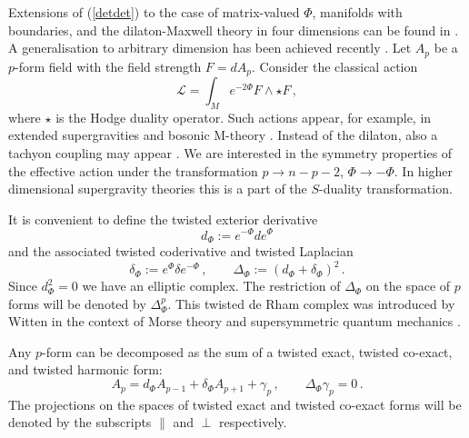 Extensions of (\ref{detdet}) to the case of matrix-valued $\Phi$,
manifolds with boundaries, and the dilaton-Maxwell theory in
four dimensions can be found in \cite{Vassilevich:2000kt}.
A generalisation to arbitrary dimension has been achieved recently 
\cite{Gilkey:2002qd}. Let $A_p$ be a $p$-form field with the field
strength $F=dA_p$. Consider the classical action
\begin{equation}
{\mathcal{L}}=\int_M e^{-2\Phi} F\wedge \star F \,,\label{pformact}
\end{equation}
where $\star$ is the Hodge duality operator. 
Such actions appear, for example, in extended supergravities
\cite{Cremmer:1978tt} and bosonic M-theory \cite{Horowitz:2000gn}.
Instead of the dilaton, also a tachyon coupling may appear
\cite{Klebanov:1998yy}. We are interested in the symmetry properties
of the effective action under the transformation 
$p\to n-p-2$, $\Phi\to -\Phi$. In higher dimensional supergravity
theories this is a part of the $S$-duality transformation.

It is convenient to define
the twisted exterior derivative
\begin{equation}
d_\Phi :=e^{-\Phi} d e^{\Phi} \label{twider}
\end{equation}
and the associated twisted coderivative and twisted Laplacian
\begin{equation}
\delta_\Phi :=e^\Phi \delta e^{-\Phi}\,,\qquad
\Delta_\Phi :=\left( d_\Phi + \delta_\Phi \right)^2\,.\label{twicoL}
\end{equation}
Since $d_\Phi^2=0$ we have an elliptic complex. The restriction
of $\Delta_\Phi$ on the space of $p$ forms will be denoted by
$\Delta_\Phi^p$. This twisted de Rham
complex was introduced by Witten in the context of Morse theory and
supersymmetric quantum mechanics \cite{Witten:1982im}. 

Any $p$-form can be decomposed as the sum of a twisted exact,
twisted co-exact, and twisted harmonic form:
\begin{equation}
A_p=d_\Phi A_{p-1} +\delta_\Phi A_{p+1} +\gamma_p\,,
\qquad \Delta_\Phi \gamma_p=0 \,.\label{twi-decomp}
\end{equation}
The projections on the spaces of twisted exact and twisted co-exact
forms will be denoted by the subscripts $\parallel$ and $\perp$
respectively.

